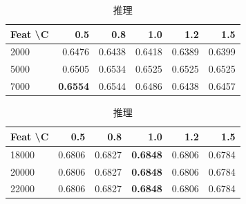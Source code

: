 \documentclass[uplatex, dvipdfmx, 11pt, a4paper, report]{jsbook}
\begin{document}
\begin{table}[H]
    \centering
    \small
    \begin{minipage}[t]{0.48\textwidth}
        \centering
        \caption{歴史}
        \begin{tabular}{l|rrrrr}
            \hline
            Feat \textbackslash C & 0.5 & 0.8 & 1.0 & 1.2 & 1.5 \\ \hline
            2000 & 0.6476 & 0.6438 & 0.6418 & 0.6389 & 0.6399 \\
            5000 & 0.6505 & 0.6534 & 0.6525 & 0.6525 & 0.6525 \\
            7000 & \textbf{0.6554} & 0.6544 & 0.6486 & 0.6438 & 0.6457 \\ \hline
        \end{tabular}
    \end{minipage}
    \hfill
    \begin{minipage}[t]{0.48\textwidth}
        \centering
        \caption{推理}
        \begin{tabular}{l|rrrrr}
            \hline
            Feat \textbackslash C & 0.5 & 0.8 & 1.0 & 1.2 & 1.5 \\ \hline
            18000 & 0.6806 & 0.6827 & \textbf{0.6848} & 0.6806 & 0.6784 \\
            20000 & 0.6806 & 0.6827 & \textbf{0.6848} & 0.6806 & 0.6784 \\
            22000 & 0.6806 & 0.6827 & \textbf{0.6848} & 0.6806 & 0.6784 \\ \hline
        \end{tabular}
    \end{minipage}
\end{table}
\end{document}
